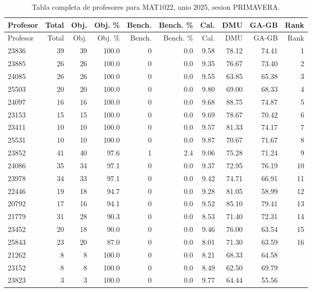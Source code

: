 \begingroup
\scriptsize
\setlength{\tabcolsep}{3pt}
\begin{longtable}{lrrrrrrrrr}
\caption{Tabla completa de profesores para MAT1022, anio 2025, sesion PRIMAVERA.}\label{tab:prof-period-mat1022-2025-primavera}\\
\toprule
Profesor & Total & Obj. & Obj. \% & Bench. & Bench. \% & Cal. & DMU & GA-GB & Rank \\
\midrule
\endfirsthead
\toprule
Profesor & Total & Obj. & Obj. \% & Bench. & Bench. \% & Cal. & DMU & GA-GB & Rank \\
\midrule
\endhead
23836 & 39 & 39 & 100.0 & 0 & 0.0 & 9.58 & 78.12 & 74.41 & 1 \\
23885 & 26 & 26 & 100.0 & 0 & 0.0 & 9.35 & 76.67 & 73.40 & 2 \\
24085 & 26 & 26 & 100.0 & 0 & 0.0 & 9.55 & 63.85 & 65.38 & 3 \\
25503 & 20 & 20 & 100.0 & 0 & 0.0 & 9.80 & 69.00 & 68.33 & 4 \\
24097 & 16 & 16 & 100.0 & 0 & 0.0 & 9.68 & 88.75 & 74.87 & 5 \\
23153 & 15 & 15 & 100.0 & 0 & 0.0 & 9.69 & 78.67 & 70.42 & 6 \\
23411 & 10 & 10 & 100.0 & 0 & 0.0 & 9.57 & 81.33 & 74.17 & 7 \\
25531 & 10 & 10 & 100.0 & 0 & 0.0 & 9.87 & 70.67 & 71.67 & 8 \\
23852 & 41 & 40 & 97.6 & 1 & 2.4 & 9.06 & 75.28 & 71.24 & 9 \\
24086 & 35 & 34 & 97.1 & 0 & 0.0 & 9.37 & 72.95 & 76.19 & 10 \\
23978 & 34 & 33 & 97.1 & 0 & 0.0 & 9.42 & 74.71 & 66.91 & 11 \\
22446 & 19 & 18 & 94.7 & 0 & 0.0 & 9.28 & 81.05 & 58.99 & 12 \\
20792 & 17 & 16 & 94.1 & 0 & 0.0 & 9.52 & 85.10 & 79.41 & 13 \\
21779 & 31 & 28 & 90.3 & 0 & 0.0 & 8.53 & 71.40 & 72.31 & 14 \\
23452 & 20 & 18 & 90.0 & 0 & 0.0 & 9.46 & 76.00 & 63.54 & 15 \\
25843 & 23 & 20 & 87.0 & 0 & 0.0 & 8.01 & 71.30 & 63.59 & 16 \\
21262 & 8 & 8 & 100.0 & 0 & 0.0 & 8.21 & 68.33 & 64.58 &  \\
23152 & 8 & 8 & 100.0 & 0 & 0.0 & 8.49 & 62.50 & 69.79 &  \\
23823 & 3 & 3 & 100.0 & 0 & 0.0 & 9.77 & 64.44 & 55.56 &  \\
\bottomrule
\end{longtable}
\endgroup

